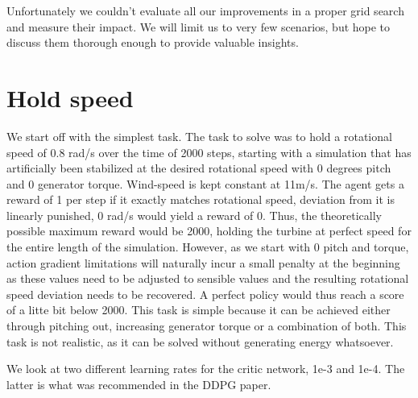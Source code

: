 \documentclass[hyperref,final,beleg]{cgvpub}
\begin{document}
Unfortunately we couldn't evaluate all our improvements in a proper grid search and measure their impact. We will limit us to very few scenarios, but hope to discuss them thorough enough to provide valuable insights.

\section{Hold speed}

We start off with the simplest task. The task to solve was to hold a rotational speed of 0.8 rad/s over the time of 2000 steps, starting with a simulation that has artificially been stabilized at the desired rotational speed with 0 degrees pitch and 0 generator torque. Wind-speed is kept constant at 11m/s. The agent gets a reward of 1 per step if it exactly matches rotational speed, deviation from it is linearly punished, 0 rad/s would yield a reward of 0. Thus, the theoretically possible maximum reward would be 2000, holding the turbine at perfect speed for the entire length of the simulation. However, as we start with 0 pitch and torque, action gradient limitations will naturally incur a small penalty at the beginning as these values need to be adjusted to sensible values and the resulting rotational speed deviation needs to be recovered. A perfect policy would thus reach a score of a litte bit below 2000. This task is simple because it can be achieved either through pitching out, increasing generator torque or a combination of both. This task is not realistic, as it can be solved without generating energy whatsoever.

We look at two different learning rates for the critic network, 1e-3 and 1e-4. The latter is what was recommended in the DDPG paper.
\end{document}
